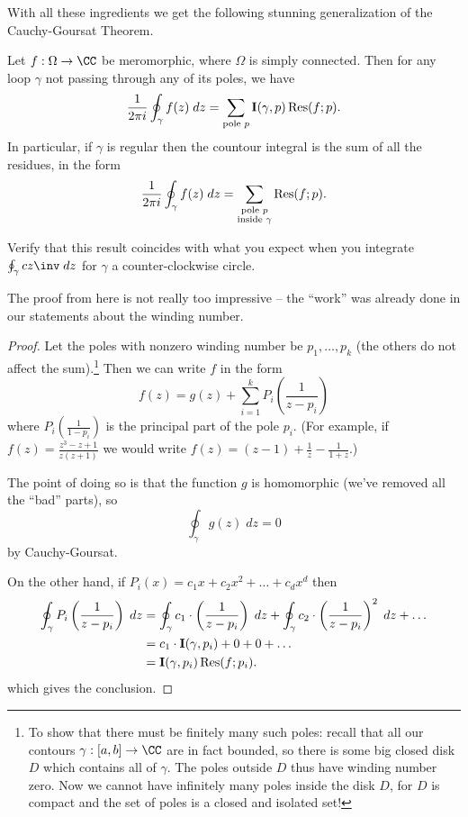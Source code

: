 \begin{definition}
With all these ingredients we get the following stunning generalization of the Cauchy-Goursat Theorem.
\begin{theorem}
	Let $f : \Omega \to \CC$ be meromorphic, where $\Omega$ is simply connected.
	Then for any loop $\gamma$ not passing through any of its poles, we have
	\[
		\frac{1}{2\pi i} \oint_{\gamma} f(z) \; dz
		= \sum_{\text{pole $p$}} \operatorname{\mathbf I}(\gamma, p) \operatorname{Res}(f; p).
	\]
	In particular, if $\gamma$ is regular then the countour integral is the sum of all the residues, in the form
	\[
		\frac{1}{2\pi i} \oint_{\gamma} f(z) \; dz
		= \sum_{\substack{\text{pole $p$} \\ \text{inside $\gamma$}}}  \operatorname{Res}(f; p).
	\]
\end{theorem}
\begin{ques}
	Verify that this result coincides
	with what you expect when you integrate $\oint_\gamma cz\inv \; dz$
	for $\gamma$ a counter-clockwise circle.
\end{ques}

The proof from here is not really too impressive -- the ``work'' was already
done in our statements about the winding number.
\begin{proof}
	Let the poles with nonzero winding number be $p_1, \dots, p_k$ (the others do not affect the sum).\footnote{
		To show that there must be finitely many such poles: recall that all our contours $\gamma : [a,b] \to \CC$
		are in fact bounded, so there is some big closed disk $D$ which contains all of $\gamma$.
		The poles outside $D$ thus have winding number zero.
		Now we cannot have infinitely many poles inside the disk $D$, for $D$ is compact and the
		set of poles is a closed and isolated set!}
	Then we can write $f$ in the form
	\[
		f(z) = g(z) + \sum_{i=1}^k P_i\left( \frac{1}{z-p_i} \right)
	\]
	where $P_i\left( \frac{1}{1-p_i} \right)$ is the principal part of the pole $p_i$.
	(For example, if $f(z) = \frac{z^3-z+1}{z(z+1)}$ we would write $f(z) = (z-1) + \frac1z - \frac1{1+z}$.)

	The point of doing so is that the function $g$ is homomorphic (we've removed all the ``bad'' parts), so 
	\[ \oint_{\gamma} g(z) \; dz = 0 \]
	by Cauchy-Goursat.

	On the other hand, if $P_i(x) = c_1x + c_2x^2 + \dots + c_d x^d$ then
	\begin{align*}
		\oint_{\gamma} P_i\left( \frac{1}{z-p_i} \right) \; dz
		&=
		\oint_{\gamma} c_1 \cdot \left( \frac{1}{z-p_i} \right) \; dz
		+ \oint_{\gamma} c_2 \cdot \left( \frac{1}{z-p_i} \right)^2 \; dz
		+ \dots \\
		&= c_1 \cdot \operatorname{\mathbf I}(\gamma, p_i) + 0 + 0 + \dots \\
		&= \operatorname{\mathbf I}(\gamma, p_i) \operatorname{Res}(f; p_i).
	\end{align*}
	which gives the conclusion.
\end{proof}


\end{definition}
